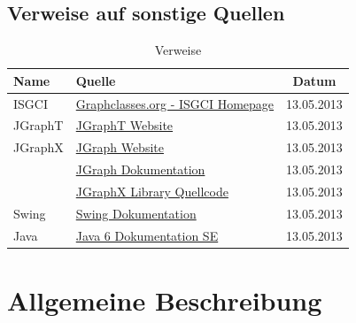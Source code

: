 \documentclass[10pt,a4paper]{article}
\begin{document}
  	\subsection{Verweise auf sonstige Quellen} %
  	{
          
          \begin{table}[h]
          	\caption{Verweise}
          	\label{fig:figurename}
          	\begin{center}
          		\begin{tabular}{|l|p{10cm}|c|}
          		\hline
          
          		\hline
          		\textbf{Name} & \textbf{Quelle} & \textbf{Datum} \\
          		\hline
          			 ISGCI & \href{http://www.graphclasses.org/}{Graphclasses.org - ISGCI Homepage} & 13.05.2013\\ \hline
          			 JGraphT & \href{http://jgrapht.org/}{JGraphT Website} & 13.05.2013 \\ \hline
          			 JGraphX & \href{http://www.jgraph.com/}{JGraph Website} & 13.05.2013 \\  \hline
          			  & \href{http://jgraph.github.io/mxgraph/java/docs/index.html}{JGraph Dokumentation} & 13.05.2013 \\  \hline
          			  & \href{https://github.com/jgraph/jgraphx}{JGraphX Library Quellcode} & 13.05.2013\\  \hline
					Swing & \href{http://docs.oracle.com/javase/1.4.2/docs/api/javax/swing/package-summary.html}{Swing Dokumentation} & 13.05.2013 \\  \hline
					Java & \href{http://docs.oracle.com/javase/6/docs/api/}{Java 6 Dokumentation SE} & 13.05.2013 \\  \hline
          		\end{tabular}
          	\end{center}
          \end{table}
          }
    
  	
\newpage
\section{Allgemeine Beschreibung} %
\end{document}
